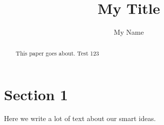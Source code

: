 \documentclass{article}
\begin{document}
\title{My Title}
\author{My Name}
\maketitle

\begin{abstract}
This paper goes about.
Test 123
\end{abstract}

\section{Section 1}
Here we write a lot of text about our smart ideas.
\cite{Eckert2007}



\end{document}
